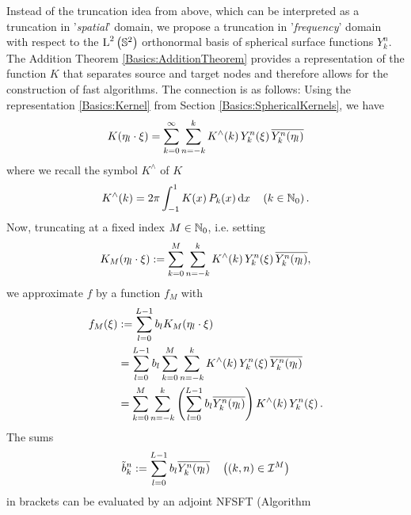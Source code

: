 Instead of the truncation idea from above, which can be interpreted as a truncation in 
'\emph{spatial}' domain, we propose a truncation in '\emph{frequency}' domain with respect 
to the $\text{\rm{L}}^{2}\left(\mathbb{S}^2\right)$ orthonormal basis  
of spherical surface functions $Y_{k}^n$. The Addition 
Theorem \ref{Basics:AdditionTheorem} provides a 
representation of the function $K$ that separates source and target nodes and 
therefore allows for the construction of fast algorithms. The connection is as 
follows: Using the representation \eqref{Basics:Kernel} from Section 
\ref{Basics:SphericalKernels}, we have
\begin{equation}
  \label{Applications:KSeries}
  K{\hspace{-0.4ex}}\left(\mathbf{\eta}_{l} \cdot \mathbf{\xi}\right) = \sum_{k=0}^{\infty} \sum_{n=-k}^k 
  K^{\wedge}{\hspace{-0.4ex}}\left(k\right)   Y_{k}^n{\hspace{-0.4ex}}\left(\mathbf{\xi}\right) \overline{Y_{k}^n{\hspace{-0.4ex}}\left(\mathbf{\eta}_{l}\right)}
\end{equation}
where we recall the symbol $K^{\wedge}$ of $K$
\[
  K^{\wedge}{\hspace{-0.4ex}}\left(k\right) = 2 \pi \int_{-1}^{1} K{\hspace{-0.4ex}}\left(x\right) P_{k}{\hspace{-0.4ex}}\left(x\right) \text{\rm{d}} x 
  \quad \left(k \in \mathbb{N}_{0}\right).
\]
Now, truncating at a fixed index $M \in \mathbb{N}_{0}$, i.e. setting
\begin{equation}
  \label{Applications:TruncatedSeries}
  K_{M}{\hspace{-0.4ex}}\left(\mathbf{\eta}_{l} \cdot \mathbf{\xi}\right) := 
  \sum_{k=0}^{M} \sum_{n=-k}^k K^{\wedge}{\hspace{-0.4ex}}\left(k\right) Y_{k}^n{\hspace{-0.4ex}}\left(\mathbf{\xi}\right) \overline{Y_{k}^n{\hspace{-0.4ex}}\left(\mathbf{\eta}_{l}\right)},
\end{equation}
we approximate $f$ by a function $f_{M}$ with
\begin{equation}
  \nonumber
  \begin{split}
    f_{M}{\hspace{-0.4ex}}\left(\xi\right) & := \sum_{l = 0}^{L-1} b_{l} K_{M}{\hspace{-0.4ex}}\left(\mathbf{\eta}_{l} \cdot \mathbf{\xi}\right) \\
                 &       = \sum_{l = 0}^{L-1} b_{l} \sum_{k=0}^{M} \sum_{n=-k}^k K^{\wedge}{\hspace{-0.4ex}}\left(k\right)
                           Y_{k}^n{\hspace{-0.4ex}}\left(\mathbf{\xi}\right) \overline{Y_{k}^n{\hspace{-0.4ex}}\left(\mathbf{\eta}_{l}\right)} \\
                 &       = \sum_{k=0}^{M} \sum_{n=-k}^k \left(\sum_{l = 0}^{L-1} b_{l}
                           \overline{Y_{k}^n{\hspace{-0.4ex}}\left(\mathbf{\eta}_{l}\right)}\right) K^{\wedge}{\hspace{-0.4ex}}\left(k\right) Y_{k}^n{\hspace{-0.4ex}}\left(\mathbf{\xi}\right).
  \end{split}                           
\end{equation}
The sums
\begin{equation}
\label{Applications:AdjointNDSFT}
  \tilde{b}_{k}^n := \sum_{l = 0}^{L-1} b_{l} \overline{Y_{k}^n{\hspace{-0.4ex}}\left(\mathbf{\eta}_{l}\right)} \quad \left((k,n) \in \mathcal{I}^M\right)
\end{equation}
in brackets can be evaluated by an adjoint NFSFT (Algorithm 
